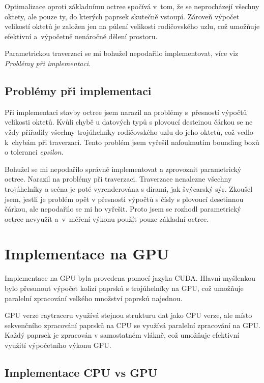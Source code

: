 \documentclass[10pt,a4paper]{article}
\begin{document}
Optimalizace oproti základnímu octree spočívá v~tom, že se neprocházejí všechny oktety, ale pouze ty, do kterých paprsek skutečně vstoupí. Zároveň výpočet velikostí oktetů je založen jen na půlení velikosti rodičovského uzlu, což umožňuje efektivní a~výpočetně nenáročné dělení prostoru.

Parametrickou traverzaci se mi bohužel nepodařilo implementovat, více viz \textit{Problémy při implementaci}.

\subsection{Problémy při implementaci}

Při implementaci stavby octree jsem narazil na problémy s~přesností výpočtů velikosti oktetů. Kvůli chybě u datových typů s plovoucí desteinou čárkou se ne vždy přiřadily všechny trojúhelníky rodičovského uzlu do jeho oktetů, což vedlo k~chybám při traverzaci. Tento problém jsem vyřešil nafouknutím bounding boxů o toleranci \textit{epsilon}.

Bohužel se  mi nepodařilo správně implementovat a zprovoznit parametrický octree. Narazil na problémy při traverzaci. Traverzace nenalezne všechny trojúhelníky a scéna je poté vyrenderována s dírami, jak švýcarský sýr. Zkoušel jsem, jestli je problém opět v přesnosti výpočtů s čísly s plovoucí desetinnou čárkou, ale nepodařilo se mi ho vyřešit. Proto jsem se rozhodl parametrický octree nevyužít a~v~měření výkonu použít pouze základní octree.


\section{Implementace na GPU}
\label{sec:gpu-implementation}

Implementace na GPU byla provedena pomocí jazyka CUDA. Hlavní myšlenkou bylo přesunout výpočet kolizí paprsků s trojúhelníky na GPU, což umožňuje paralelní zpracování velkého množství paprsků najednou.

GPU verze raytraceru využívá stejnou strukturu dat jako CPU verze, ale místo sekvenčního zpracování paprsků na CPU se využívá paralelní zpracování na GPU. Každý paprsek je zpracován v samostatném vlákně, což umožňuje efektivní využití výpočetního výkonu GPU.

\subsection{Implementace CPU vs GPU}
\end{document}
